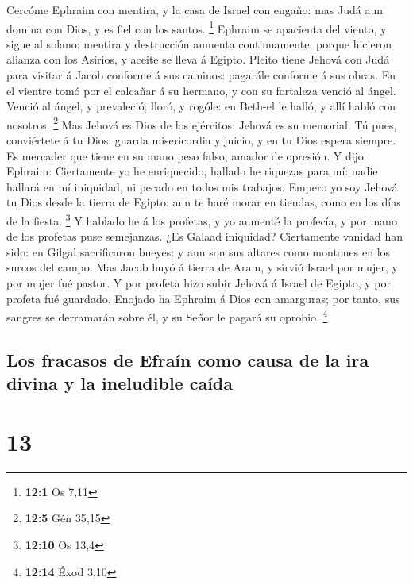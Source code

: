  Cercóme Ephraim con mentira, y la casa de Israel con
engaño: mas Judá aun domina con Dios, y es fiel con los santos.
\footnote{\textbf{12:1} Os 7,11}  Ephraim se apacienta del
viento, y sigue al solano: mentira y destrucción aumenta continuamente;
porque hicieron alianza con los Asirios, y aceite se lleva á Egipto.
 Pleito tiene Jehová con Judá para visitar á Jacob conforme
á sus caminos: pagarále conforme á sus obras.  En el vientre
tomó por el calcañar á su hermano, y con su fortaleza venció al ángel.
 Venció al ángel, y prevaleció; lloró, y rogóle: en Beth-el
le halló, y allí habló con nosotros. \footnote{\textbf{12:5} Gén 35,15}
 Mas Jehová es Dios de los ejércitos: Jehová es su memorial.
 Tú pues, conviértete á tu Dios: guarda misericordia y
juicio, y en tu Dios espera siempre.  Es mercader que tiene
en su mano peso falso, amador de opresión.  Y dijo Ephraim:
Ciertamente yo he enriquecido, hallado he riquezas para mí: nadie
hallará en mí iniquidad, ni pecado en todos mis trabajos. 
Empero yo soy Jehová tu Dios desde la tierra de Egipto: aun te haré
morar en tiendas, como en los días de la fiesta. \footnote{\textbf{12:10}
  Os 13,4}  Y hablado he á los profetas, y yo aumenté la
profecía, y por mano de los profetas puse semejanzas.  ¿Es
Galaad iniquidad? Ciertamente vanidad han sido: en Gilgal sacrificaron
bueyes: y aun son sus altares como montones en los surcos del campo.
 Mas Jacob huyó á tierra de Aram, y sirvió Israel por
mujer, y por mujer fué pastor.  Y por profeta hizo subir
Jehová á Israel de Egipto, y por profeta fué guardado. Enojado ha
Ephraim á Dios con amarguras; por tanto, sus sangres se derramarán sobre
él, y su Señor le pagará su oprobio. \footnote{\textbf{12:14} Éxod 3,10}

\hypertarget{los-fracasos-de-efrauxedn-como-causa-de-la-ira-divina-y-la-ineludible-cauxedda}{%
\subsection{Los fracasos de Efraín como causa de la ira divina y la
ineludible
caída}\label{los-fracasos-de-efrauxedn-como-causa-de-la-ira-divina-y-la-ineludible-cauxedda}}

\hypertarget{section-12}{%
\section{13}\label{section-12}}

